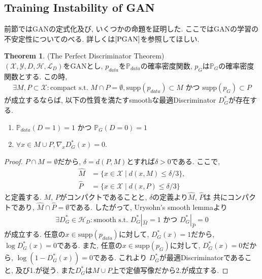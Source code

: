 \documentclass[11pt, a4paper, dvipdfmx]{jsarticle}
\theoremstyle{definition}
\newtheorem{Theorem+}[Axiom+]{Theorem}
\newcommand{\X}{\mathcal{X}}
\newcommand{\Y}{\mathcal{Y}}
\newcommand{\Hil}{\mathcal{H}}
\newcommand{\Loss}{\mathcal{L}_{D}}
\newcommand{\MLsp}{(\X, \Y, D, \Hil, \Loss)}
\begin{document}
\subsection{Training Instability of GAN}
前節ではGANの定式化及び, いくつかの命題を証明した. ここではGANの学習の不安定性についてのべる. 詳しくは$\cite{PGAN}$を参照してほしい.
\begin{Theorem+}(The Perfect Discriminator Theorem)\\
    $\MLsp$をGANとし, $p_{data}$を$\mathbb{P}_{data}$の確率密度関数, $p_{G}$は$\mathbb{P}_{G}$の確率密度関数とする. この時, 
    \begin{align*}
        \exists M, P\subset\X:\text{compact s.t. }M\cap P = \emptyset, \text{supp}(p_{data})\subset M\text{ かつ }\text{supp}(p_{G})\subset P
    \end{align*}
    が成立するならば, 以下の性質を満たすsmoothな最適Discriminator $D_{G}^{*}$が存在する. 
    \begin{enumerate}
        \item $\mathbb{P}_{data}(D = 1) = 1\text{ かつ }\mathbb{P}_{G}(D = 0) = 1$
        \item $\forall x\in M\cup P, \nabla_{x}D_{G}^{*}(x) = 0$.
    \end{enumerate}
    \begin{proof}
        $P\cap M = \emptyset$だから, $\delta = d(P, M)$とすれば$\delta > 0$である. 
        ここで, 
        \begin{align*}
            \hat{M} &= \{x\in\X\mid d(x, M) \leq\delta/3\},\\
            \hat{P} &= \{x\in\X\mid d(x, P)\leq\delta/3\}
        \end{align*}
        と定義する. $M$, $P$がコンパクトであることと, $\delta$の定義より$\hat{M}$, $\hat{P}$は
        共にコンパクトであり, $\hat{M}\cap\hat{P}=\emptyset$である. したがって, Urysohn's smooth lemmaより
        \begin{align*}
            \exists D_{G}^{*}\in\Hil_{D}:\text{smooth s.t. } D_{G}^{*}|_{\hat{M}} = 1\text{ かつ }D_{G}^{*}|_{\hat{P}} = 0
        \end{align*}
        が成立する. 任意の$x\in\text{supp}(p_{data})$に対して, $D_{G}^{*}(x) = 1$だから, $\log D_{G}^{*}(x) = 0$である. 
        また, 任意の$x\in\text{supp}(p_{G})$に対して, $D_{G}^{*}(x) = 0$だから, $\log (1 - D_{G}^{*}(x)) = 0$である. これより
        $D_{G}^{*}$が最適Discriminatorであること, 及び1.が従う. また$D_{G}^{*}$は$M\cup P$上で定値写像だから2.が成立する. 
    \end{proof}
\end{Theorem+}
\end{document}
